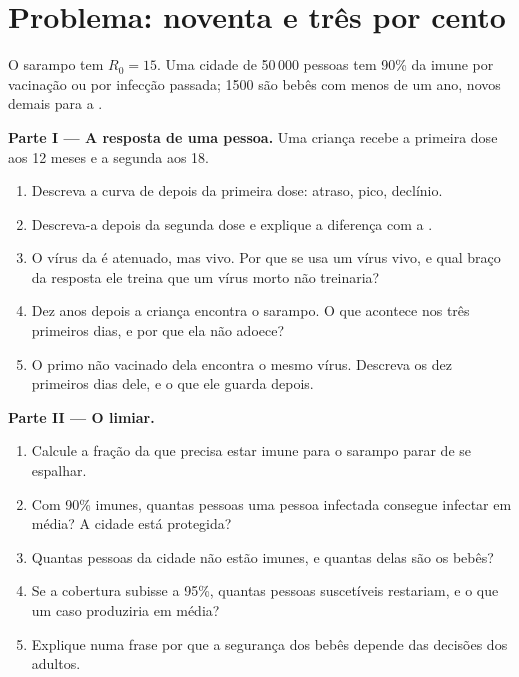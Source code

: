 \section{Problema: noventa e três por cento}

\begin{problem}
\label{pb:g12:adaptive-immunity:1}
O sarampo tem $R_0 = 15$. Uma cidade de 50\,000 pessoas tem 90\% da
 imune por vacinação ou por infecção passada; 1500 são bebês
com menos de um ano, novos demais para a .

\medskip
\noindent\textbf{Parte I --- A resposta de uma pessoa.}
Uma criança recebe a primeira dose aos 12 meses e a segunda aos 18.
\begin{enumerate}
  \item Descreva a curva de  depois da primeira dose:
        atraso, pico, declínio.
  \item Descreva-a depois da segunda dose e explique a diferença com a
        .
  \item O vírus da  é atenuado, mas vivo. Por que se usa um vírus
        vivo, e qual braço da resposta ele treina que um vírus morto
        não treinaria?
  \item Dez anos depois a criança encontra o sarampo. O que acontece
        nos três primeiros dias, e por que ela não adoece?
  \item O primo não vacinado dela encontra o mesmo vírus. Descreva os
        dez primeiros dias dele, e o que ele guarda depois.
\end{enumerate}

\medskip
\noindent\textbf{Parte II --- O limiar.}
\begin{enumerate}[resume]
  \item Calcule a fração da  que precisa estar imune para o
        sarampo parar de se espalhar.
  \item Com 90\% imunes, quantas pessoas uma pessoa infectada consegue
        infectar em média? A cidade está protegida?
  \item Quantas pessoas da cidade não estão imunes, e quantas delas são
        os bebês?
  \item Se a cobertura subisse a 95\%, quantas pessoas suscetíveis
        restariam, e o que um caso produziria em média?
  \item Explique numa frase por que a segurança dos bebês depende das
        decisões dos adultos.
\end{enumerate}


\end{problem}
